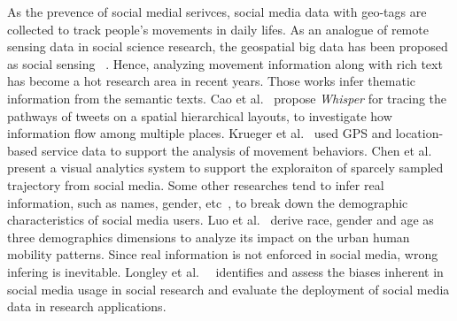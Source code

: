 As the prevence of social medial serivces, social media data with geo-tags are collected to track people's movements in daily lifes. As an analogue of remote sensing data in social science research, the geospatial big data has been proposed as social sensing ~\cite{liu2015social}. Hence, analyzing movement information along with rich text has become a hot research area in recent years. Those works infer thematic information from the semantic texts. Cao et al.~\cite{cao2012whisper} propose \textit{Whisper} for tracing the pathways of tweets on a spatial hierarchical layouts, to investigate how information flow among multiple places. Krueger et al.~\cite{krueger2014visual} used GPS and location-based service data to support the analysis of movement behaviors. Chen et al.~\cite{chen2016interactive} present a visual analytics system to support the exploraiton of sparcely sampled trajectory from social media. Some other researches tend to infer real information, such as names, gender, etc~\cite{peddinti2014internet}, to break down the demographic characteristics of social media users. Luo et al.~\cite{luo2016explore} derive race, gender and age as three demographics dimensions to analyze its impact on the urban human mobility patterns. Since real information is not enforced in social media, wrong infering is inevitable. Longley et al.~\cite{Longley2015}~\cite{Paul2016_twitter} identifies and assess the biases inherent in social media usage in social research and evaluate the deployment of social media data in research applications.  







